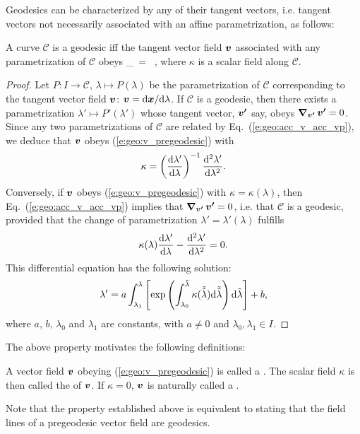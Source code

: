 Geodesics can be characterized by any of their tangent vectors, i.e.
tangent vectors not necessarily associated with an affine parametrization, as follows:
\begin{greybox}
A curve $\mathcal{C}$ is a geodesic
iff the tangent vector field $\bm{v}$ associated with any parametrization
of $\mathcal{C}$ obeys
\be \label{e:geo:v_pregeodesic}
    \wnab_{}\, = \kappa\,  ,
\ee
where $\kappa$ is a scalar field along $\mathcal{C}$.
\end{greybox}
\begin{proof}
Let $P: I\to \mathcal{C}$, $\lambda\mapsto P(\lambda)$ be the parametrization of $\mathcal{C}$
corresponding to the tangent vector field $\bm{v}$: $\bm{v} = \mathrm{d}\bm{x}/\mathrm{d}\lambda$.
If $\mathcal{C}$ is a geodesic, then there exists a parametrization
$\lambda'\mapsto P'(\lambda')$ whose tangent vector, $\bm{v'}$ say, obeys
$\bm{\nabla}_{\bm{v'}}\,\bm{v'} = 0$. Since any two parametrizations of $\mathcal{C}$
are related by Eq.~(\ref{e:geo:acc_v_acc_vp}), we deduce that $\bm{v}$ obeys
(\ref{e:geo:v_pregeodesic}) with
\[
    \kappa = \left( \frac{\mathrm{d}\lambda'}{\mathrm{d}\lambda} \right)^{-1}
        \frac{\mathrm{d}^2\lambda'}{\mathrm{d}\lambda^2} .
\]
Conversely, if $\bm{v}$ obeys (\ref{e:geo:v_pregeodesic}) with $\kappa=\kappa(\lambda)$,
then Eq.~(\ref{e:geo:acc_v_acc_vp}) implies that $\bm{\nabla}_{\bm{v'}}\,\bm{v'} = 0$,
i.e. that $\mathcal{C}$ is a geodesic, provided that the change of
parametrization $\lambda' = \lambda'(\lambda)$ fulfills
\[
    \kappa(\lambda) \frac{\mathrm{d}\lambda'}{\mathrm{d}\lambda} -  \frac{\mathrm{d}^2\lambda'}{\mathrm{d}\lambda^2} = 0 .
\]
This differential equation has the following solution:
\[
    \lambda' = a \int_{\lambda_1}^\lambda \left[ \exp \left(
    \int_{\lambda_0}^{\tilde{\lambda}} \kappa(\tilde{\tilde{\lambda}})
    \mathrm{d}\tilde{\tilde{\lambda}}\right) \mathrm{d}\tilde\lambda
    \right] + b,
\]
where $a$, $b$, $\lambda_0$ and $\lambda_1$ are constants, with $a\not = 0$ and $\lambda_0,\lambda_1\in I$.
\end{proof}
The above property motivates the following definitions:
\begin{greybox}
A vector field $\bm{v}$ obeying (\ref{e:geo:v_pregeodesic}) is called
a .
The scalar field $\kappa$ is then called the  of $\bm{v}$.
If $\kappa=0$, $\bm{v}$ is naturally called a .
\end{greybox}
Note that the property established above is equivalent to stating that the
field lines of a pregeodesic vector field are geodesics.

